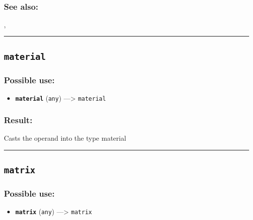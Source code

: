 \documentclass[]{book}
\providecommand{\tightlist}{%
  \setlength{\itemsep}{0pt}\setlength{\parskip}{0pt}}
\theoremstyle{definition}
\theoremstyle{definition}
\theoremstyle{definition}
\theoremstyle{remark}
\begin{document}
\begin{verbatim}
 
\end{verbatim}

\subsubsection{See also:}\label{see-also-132}

\href{OperatorsSZ\#}{},

\begin{center}\rule{0.5\linewidth}{\linethickness}\end{center}

\subsection{\texorpdfstring{\texttt{material}}{material}}\label{material-1}

\subsubsection{Possible use:}\label{possible-use-336}

\begin{itemize}
\tightlist
\item
  \textbf{\texttt{material}} (\texttt{any}) ---\textgreater{}
  \texttt{material}
\end{itemize}

\subsubsection{Result:}\label{result-325}

Casts the operand into the type material

\begin{center}\rule{0.5\linewidth}{\linethickness}\end{center}

\subsection{\texorpdfstring{\texttt{matrix}}{matrix}}\label{matrix}

\subsubsection{Possible use:}\label{possible-use-337}

\begin{itemize}
\tightlist
\item
  \textbf{\texttt{matrix}} (\texttt{any}) ---\textgreater{}
  \texttt{matrix}
\end{itemize}
\end{document}
